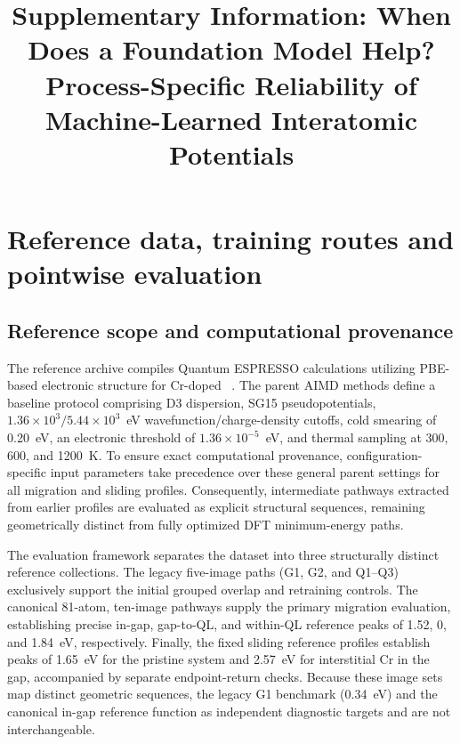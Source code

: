 \documentclass[pdflatex,sn-mathphys-num]{sn-jnl}
\begin{document}
\title[Supplementary Information]{Supplementary Information: When Does a Foundation Model Help? Process-Specific Reliability of Machine-Learned Interatomic Potentials}
\author[1]{ }

\author[1]{ }

\author[1]{ }

\author[1]{ }

\author[1]{ }
\author*[1]{ }
\maketitle

\section{Reference data, training routes and pointwise evaluation}\label{sec:reference}
\subsection{Reference scope and computational provenance}
The reference archive compiles Quantum ESPRESSO calculations utilizing PBE-based electronic structure for Cr-doped ~\citep{giannozzi2009quantum,perdew1996generalized}. The parent AIMD methods define a baseline protocol comprising D3 dispersion, SG15 pseudopotentials, $1.36\times10^{3}/5.44\times10^{3}$~eV wavefunction/charge-density cutoffs, cold smearing of 0.20~eV, an electronic threshold of $1.36\times10^{-5}$~eV, and thermal sampling at 300, 600, and 1200~K. To ensure exact computational provenance, configuration-specific input parameters take precedence over these general parent settings for all migration and sliding profiles. Consequently, intermediate pathways extracted from earlier profiles are evaluated as explicit structural sequences, remaining geometrically distinct from fully optimized DFT minimum-energy paths.

The evaluation framework separates the dataset into three structurally distinct reference collections. The legacy five-image paths (G1, G2, and Q1--Q3) exclusively support the initial grouped overlap and retraining controls. The canonical 81-atom, ten-image pathways supply the primary migration evaluation, establishing precise in-gap, gap-to-QL, and within-QL reference peaks of 1.52, 0, and 1.84~eV, respectively. Finally, the fixed sliding reference profiles establish peaks of 1.65~eV for the pristine system and 2.57~eV for interstitial Cr in the gap, accompanied by separate endpoint-return checks. Because these image sets map distinct geometric sequences, the legacy G1 benchmark (0.34~eV) and the canonical in-gap reference function as independent diagnostic targets and are not interchangeable.
\end{document}
